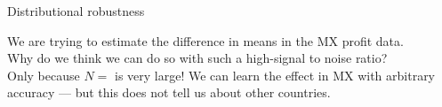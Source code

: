 

\def\glim{G_\infty}
\def\shift{\mathcal{E}}




\begin{frame}{Distributional robustness}
\MxProfitHistogram{}

We are trying to estimate the difference in means in the MX profit data.\\[1em]

Why do we think we can do so with such a high-signal to noise ratio?\\[1em]

Only because $N = $\MxNobs{} is very large!  We can learn the effect in MX
with arbitrary accuracy --- but this does not tell us about other countries.

\end{frame}




